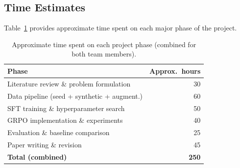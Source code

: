 \subsection{Time Estimates}

Table~\ref{tab:time} provides approximate time spent on each major phase of the project.

\begin{table}[h]
\centering
\small
\begin{tabular}{@{}lr@{}}
\toprule
\textbf{Phase} & \textbf{Approx.\ hours} \\
\midrule
Literature review \& problem formulation   & 30 \\
Data pipeline (seed + synthetic + augment.) & 60 \\
SFT training \& hyperparameter search       & 50 \\
GRPO implementation \& experiments          & 40 \\
Evaluation \& baseline comparison           & 25 \\
Paper writing \& revision                   & 45 \\
\midrule
\textbf{Total (combined)}                   & \textbf{250} \\
\bottomrule
\end{tabular}
\caption{Approximate time spent on each project phase (combined for both team members).}
\label{tab:time}
\end{table}

